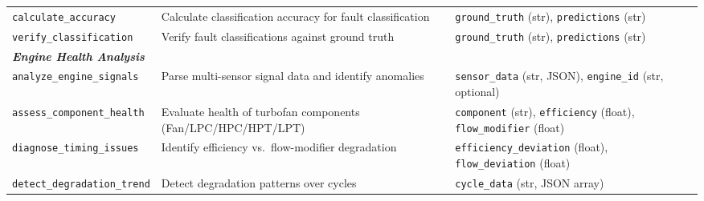 \documentclass[sigconf,review]{acmart}
\begin{document}
\begin{table}[t]
{\begin{tabular}{@{}llp{6.5cm}@{}}
\texttt{calculate\_accuracy} & Calculate classification accuracy for fault classification & \texttt{ground\_truth} (str), \texttt{predictions} (str) \\
\texttt{verify\_classification} & Verify fault classifications against ground truth & \texttt{ground\_truth} (str), \texttt{predictions} (str) \\
\midrule
\multicolumn{3}{l}{\textbf{\textit{Engine Health Analysis}}} \\
\texttt{analyze\_engine\_signals} & Parse multi-sensor signal data and identify anomalies & \texttt{sensor\_data} (str, JSON), \texttt{engine\_id} (str, optional) \\
\texttt{assess\_component\_health} & Evaluate health of turbofan components (Fan/LPC/HPC/HPT/LPT) & \texttt{component} (str), \texttt{efficiency} (float), \texttt{flow\_modifier} (float) \\
\texttt{diagnose\_timing\_issues} & Identify efficiency vs.\ flow-modifier degradation & \texttt{efficiency\_deviation} (float), \texttt{flow\_deviation} (float) \\
\texttt{detect\_degradation\_trend} & Detect degradation patterns over cycles & \texttt{cycle\_data} (str, JSON array) \\
\bottomrule
\end{tabular}%
}
\end{table}
\end{document}

